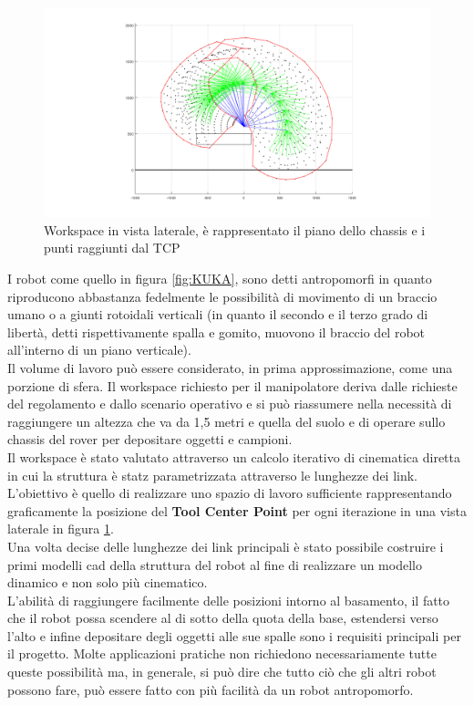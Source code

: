 \documentclass[%
corpo=11pt,
twoside,
 stile=classica,
oldstyle,
greek,%
]{toptesi}
\begin{document}
\begin{figure}
	\centering
	\includegraphics[width=1\textwidth]{Plots/workspace.png}
	\caption{Workspace in vista laterale, è rappresentato il piano dello chassis e i punti raggiunti dal TCP}
	\label{fig:workspace}
\end{figure}
I robot come quello in figura \ref{fig:KUKA}, sono detti antropomorfi in quanto riproducono abbastanza fedelmente le possibilità di movimento di un braccio umano o a giunti rotoidali verticali (in quanto il secondo e il terzo grado di libertà, detti rispettivamente spalla e gomito, muovono il braccio del robot all'interno di un piano verticale).\\ 
Il volume di lavoro può essere considerato, in prima approssimazione, come una porzione di sfera.
Il workspace richiesto per il manipolatore deriva dalle richieste del regolamento e dallo scenario operativo e si può riassumere nella necessità di raggiungere un altezza che va da 1,5 metri e quella del suolo e di operare sullo chassis del rover per depositare oggetti e campioni. \\
Il workspace è stato valutato attraverso un calcolo iterativo di cinematica diretta in cui la struttura è statz parametrizzata attraverso le lunghezze dei link. L'obiettivo è quello di realizzare uno spazio di lavoro sufficiente rappresentando graficamente la posizione del \textbf{Tool Center Point} per ogni iterazione in una vista laterale in figura \ref{fig:workspace}. \\
Una volta decise delle lunghezze dei link principali è stato possibile costruire i primi modelli cad della struttura del robot al fine di realizzare un modello dinamico e non solo più cinematico. \\
L'abilità di raggiungere facilmente delle posizioni intorno al basamento, il fatto che il robot possa scendere al di sotto della quota della base, estendersi verso l'alto e infine depositare degli oggetti alle sue spalle sono i requisiti principali per il progetto. 
Molte applicazioni pratiche non richiedono necessariamente tutte queste possibilità ma, in generale, si può dire che tutto ciò che gli altri robot possono fare, può essere fatto con più facilità da un robot antropomorfo.\\
\end{document}
